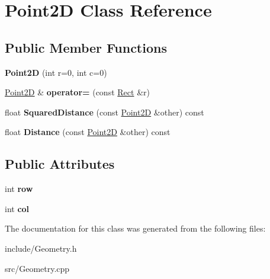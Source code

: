 \hypertarget{classPoint2D}{}\section{Point2\+D Class Reference}
\label{classPoint2D}
\subsection*{Public Member Functions}
\begin{DoxyCompactItemize}
\item 
\hypertarget{classPoint2D_ab6b269e58cadf99c3b290a43e04c9576}{}{\bfseries Point2\+D} (int r=0, int c=0)\label{classPoint2D_ab6b269e58cadf99c3b290a43e04c9576}

\item 
\hypertarget{classPoint2D_ab91688dc27a2072ab3efaf068c7a57e0}{}\hyperlink{classPoint2D}{Point2\+D} \& {\bfseries operator=} (const \hyperlink{classRect}{Rect} \&r)\label{classPoint2D_ab91688dc27a2072ab3efaf068c7a57e0}

\item 
\hypertarget{classPoint2D_a05def5ae8c585b81abacbbfab95ced7d}{}float {\bfseries Squared\+Distance} (const \hyperlink{classPoint2D}{Point2\+D} \&other) const \label{classPoint2D_a05def5ae8c585b81abacbbfab95ced7d}

\item 
\hypertarget{classPoint2D_a53134a6fffd5af2cc0e94267b1c50f4e}{}float {\bfseries Distance} (const \hyperlink{classPoint2D}{Point2\+D} \&other) const \label{classPoint2D_a53134a6fffd5af2cc0e94267b1c50f4e}

\end{DoxyCompactItemize}
\subsection*{Public Attributes}
\begin{DoxyCompactItemize}
\item 
\hypertarget{classPoint2D_ab2066342cc783a1ff0f0cf0e8357138a}{}int {\bfseries row}\label{classPoint2D_ab2066342cc783a1ff0f0cf0e8357138a}

\item 
\hypertarget{classPoint2D_af5f355c29cdbafa6e446208824a77b19}{}int {\bfseries col}\label{classPoint2D_af5f355c29cdbafa6e446208824a77b19}

\end{DoxyCompactItemize}


The documentation for this class was generated from the following files\+:\begin{DoxyCompactItemize}
\item 
include/Geometry.\+h\item 
src/Geometry.\+cpp\end{DoxyCompactItemize}
